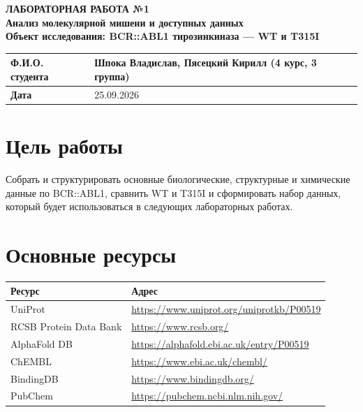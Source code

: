 \documentclass[11pt,a4paper]{article}
\begin{document}
\begin{center}
{\LARGE\bfseries ЛАБОРАТОРНАЯ РАБОТА №1}\\[8pt]
{\large\bfseries Анализ молекулярной мишени и доступных данных}\\[6pt]
{\bfseries Объект исследования: BCR::ABL1 тирозинкиназа --- WT и T315I}
\end{center}

\vspace{10pt}

\begin{center}
\begin{tabular}{|L{5cm}|L{7cm}|}
\hline
\textbf{Ф.И.О. студента} & Шпока Владислав, Пясецкий Кирилл (4 курс, 3 группа) \\
\hline
\textbf{Дата} & 25.09.2026 \\
\hline
\end{tabular}
\end{center}

\vspace{10pt}

\section*{Цель работы}
Собрать и структурировать основные биологические, структурные и химические данные по
BCR::ABL1, сравнить WT и T315I и сформировать набор данных, который будет
использоваться в следующих лабораторных работах.

\section*{Основные ресурсы}

\begin{center}
\begin{tabular}{|L{6cm}|L{9.5cm}|}
\hline
\textbf{Ресурс} & \textbf{Адрес} \\
\hline
UniProt & \url{https://www.uniprot.org/uniprotkb/P00519} \\
\hline
RCSB Protein Data Bank & \url{https://www.rcsb.org/} \\
\hline
AlphaFold DB & \url{https://alphafold.ebi.ac.uk/entry/P00519} \\
\hline
ChEMBL & \url{https://www.ebi.ac.uk/chembl/} \\
\hline
BindingDB & \url{https://www.bindingdb.org/} \\
\hline
PubChem & \url{https://pubchem.ncbi.nlm.nih.gov/} \\
\hline
\end{tabular}
\end{center}
\end{document}
